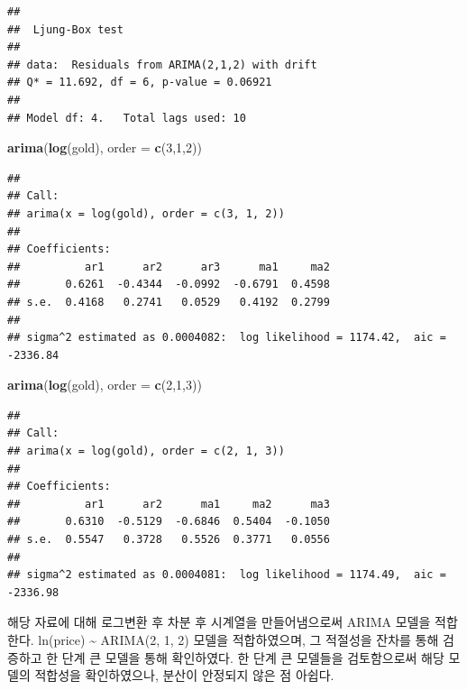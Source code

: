\documentclass[
]{article}
\newenvironment{Shaded}{\begin{snugshade}}{\end{snugshade}}
\newcommand{\AttributeTok}[1]{\textcolor[rgb]{0.13,0.29,0.53}{#1}}
\newcommand{\DecValTok}[1]{\textcolor[rgb]{0.00,0.00,0.81}{#1}}
\newcommand{\FunctionTok}[1]{\textcolor[rgb]{0.13,0.29,0.53}{\textbf{#1}}}
\newcommand{\NormalTok}[1]{#1}
\begin{document}
\begin{verbatim}
## 
##  Ljung-Box test
## 
## data:  Residuals from ARIMA(2,1,2) with drift
## Q* = 11.692, df = 6, p-value = 0.06921
## 
## Model df: 4.   Total lags used: 10
\end{verbatim}

\begin{Shaded}
\begin{Highlighting}[]
\FunctionTok{arima}\NormalTok{(}\FunctionTok{log}\NormalTok{(gold), }\AttributeTok{order =} \FunctionTok{c}\NormalTok{(}\DecValTok{3}\NormalTok{,}\DecValTok{1}\NormalTok{,}\DecValTok{2}\NormalTok{))}
\end{Highlighting}
\end{Shaded}

\begin{verbatim}
## 
## Call:
## arima(x = log(gold), order = c(3, 1, 2))
## 
## Coefficients:
##          ar1      ar2      ar3      ma1     ma2
##       0.6261  -0.4344  -0.0992  -0.6791  0.4598
## s.e.  0.4168   0.2741   0.0529   0.4192  0.2799
## 
## sigma^2 estimated as 0.0004082:  log likelihood = 1174.42,  aic = -2336.84
\end{verbatim}

\begin{Shaded}
\begin{Highlighting}[]
\FunctionTok{arima}\NormalTok{(}\FunctionTok{log}\NormalTok{(gold), }\AttributeTok{order =} \FunctionTok{c}\NormalTok{(}\DecValTok{2}\NormalTok{,}\DecValTok{1}\NormalTok{,}\DecValTok{3}\NormalTok{))}
\end{Highlighting}
\end{Shaded}

\begin{verbatim}
## 
## Call:
## arima(x = log(gold), order = c(2, 1, 3))
## 
## Coefficients:
##          ar1      ar2      ma1     ma2      ma3
##       0.6310  -0.5129  -0.6846  0.5404  -0.1050
## s.e.  0.5547   0.3728   0.5526  0.3771   0.0556
## 
## sigma^2 estimated as 0.0004081:  log likelihood = 1174.49,  aic = -2336.98
\end{verbatim}

해당 자료에 대해 로그변환 후 차분 후 시계열을 만들어냄으로써 ARIMA
모델을 적합한다. ln(price) \textasciitilde{} ARIMA(2, 1, 2) 모델을
적합하였으며, 그 적절성을 잔차를 통해 검증하고 한 단계 큰 모델을 통해
확인하였다. 한 단계 큰 모델들을 검토함으로써 해당 모델의 적합성을
확인하였으나, 분산이 안정되지 않은 점 아쉽다.
\end{document}
